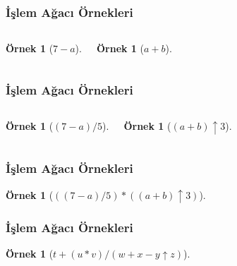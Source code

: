 \documentclass[dvipsnames]{beamer}
\theoremstyle{definition}
\theoremstyle{example}
\newtheorem{ornek}[theorem]{Örnek}
\theoremstyle{plain}
\begin{document}
\begin{frame}
  \frametitle{İşlem Ağacı Örnekleri}

  \begin{columns}[t]
    \begin{ornek}[$7-a$]
      \begin{center}
      \end{center}
    \end{ornek}

    \begin{ornek}[$a+b$]
      \begin{center}
      \end{center}
    \end{ornek}
  \end{columns}
\end{frame}

\begin{frame}
  \frametitle{İşlem Ağacı Örnekleri}

  \begin{columns}[t]
    \begin{ornek}[$(7-a)/5$]
      \begin{center}
      \end{center}
    \end{ornek}

    \begin{ornek}[$(a+b) \uparrow 3$]
      \begin{center}
      \end{center}
    \end{ornek}
  \end{columns}
\end{frame}

\begin{frame}
  \frametitle{İşlem Ağacı Örnekleri}

  \begin{ornek}[$((7-a)/5)*((a+b) \uparrow 3)$]
    \begin{center}
    \end{center}
  \end{ornek}
\end{frame}

\begin{frame}
  \frametitle{İşlem Ağacı Örnekleri}

  \begin{ornek}[$t+(u*v)/(w+x-y \uparrow z)$]
    \begin{center}
    \end{center}
  \end{ornek}
\end{frame}
\end{document}
